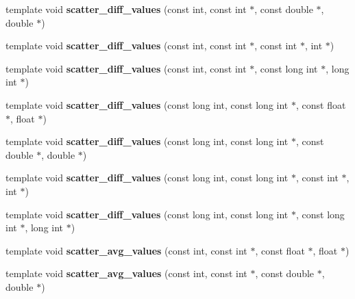 \begin{DoxyCompactItemize}
\item 
\mbox{\label{namespaceschwz_a290715fb4948e0e9b86990bd1944eb70}} 
template void {\bfseries scatter\+\_\+diff\+\_\+values} (const int, const int $\ast$, const double $\ast$, double $\ast$)
\item 
\mbox{\label{namespaceschwz_ada8676d66f231b3a53e5e1ff7d999e50}} 
template void {\bfseries scatter\+\_\+diff\+\_\+values} (const int, const int $\ast$, const int $\ast$, int $\ast$)
\item 
\mbox{\label{namespaceschwz_a454b51812416f906f354513e14b8575c}} 
template void {\bfseries scatter\+\_\+diff\+\_\+values} (const int, const int $\ast$, const long int $\ast$, long int $\ast$)
\item 
\mbox{\label{namespaceschwz_a5d8ea9635fd2508d326deeccd62eca20}} 
template void {\bfseries scatter\+\_\+diff\+\_\+values} (const long int, const long int $\ast$, const float $\ast$, float $\ast$)
\item 
\mbox{\label{namespaceschwz_a5204d95c2a2ac0411bc32e532d17ad8f}} 
template void {\bfseries scatter\+\_\+diff\+\_\+values} (const long int, const long int $\ast$, const double $\ast$, double $\ast$)
\item 
\mbox{\label{namespaceschwz_a9706758b09de68439483045a467392e8}} 
template void {\bfseries scatter\+\_\+diff\+\_\+values} (const long int, const long int $\ast$, const int $\ast$, int $\ast$)
\item 
\mbox{\label{namespaceschwz_a7ac82936a1eec570aac68dc6042f4823}} 
template void {\bfseries scatter\+\_\+diff\+\_\+values} (const long int, const long int $\ast$, const long int $\ast$, long int $\ast$)
\item 
\mbox{\label{namespaceschwz_a88529ad74a3f7548c85f26f636e24212}} 
template void {\bfseries scatter\+\_\+avg\+\_\+values} (const int, const int $\ast$, const float $\ast$, float $\ast$)
\item 
\mbox{\label{namespaceschwz_adeb6898dd28ee5b0345a973d17106372}} 
template void {\bfseries scatter\+\_\+avg\+\_\+values} (const int, const int $\ast$, const double $\ast$, double $\ast$)

\end{DoxyCompactItemize}
